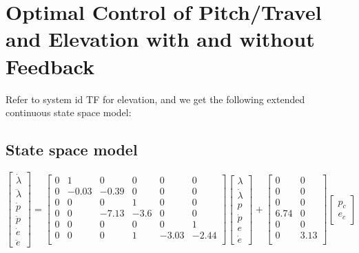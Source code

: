 \section{Optimal Control of Pitch/Travel and Elevation with and without Feedback}\label{sec:prob4}

Refer to system id TF for elevation, and we get the following extended continuous state space model:

\subsection{State space model}
\begin{equation}
	\begin{bmatrix}
		\dot{\lambda}\\
		\ddot{\lambda}	\\
		\dot{p}	\\
		\ddot{p}\\
		\dot{e}	\\
		\ddot{e}
	\end{bmatrix} = 
	\begin{bmatrix}
		0 & 1 & 0 & 0 & 0  & 0 \\
		0 & -0.03 & -0.39 & 0 & 0 & 0 \\
		0 & 0 & 0 & 1 & 0 & 0 \\
		0 & 0 & -7.13 & -3.6 & 0 & 0 \\
		0 & 0 & 0 & 0 & 0 & 1 \\
		0 & 0 & 0 & 1 & -3.03 & -2.44 \\
	\end{bmatrix}
	\begin{bmatrix}
		\lambda	\\
		\dot{\lambda}\\
		p		\\
		\dot{p} \\
		e		\\
		\dot{e}
	\end{bmatrix} +
	\begin{bmatrix}
		0 & 0\\
		0 & 0\\
		0 & 0\\
		6.74 & 0\\
		0 & 0 \\
		0 & 3.13 \\
	\end{bmatrix}
	\begin{bmatrix}
	p_c \\
	e_c
	\end{bmatrix}
	\label{eq:ex_sys}
\end{equation}

